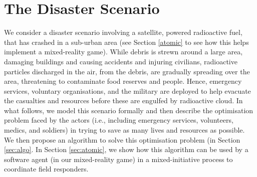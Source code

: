 \section{The Disaster Scenario}

\noindent We consider a disaster scenario involving a satellite, powered radioactive fuel, that has crashed in a sub-urban area (see Section \ref{atomic} to see how this helps implement a  mixed-reality game). While debris is strewn around a large area, damaging buildings and causing accidents and injuring civilians, radioactive particles discharged in the air, from the debris, are gradually spreading over the area, threatening to contaminate food reserves and people. Hence, emergency services, voluntary organisations, and the military are deployed to help evacuate the casualties and resources before these are engulfed by  radioactive cloud.  In what follows, we model this scenario formally and then describe the optimisation problem faced by the actors  (i.e., including emergency services, volunteers, medics, and soldiers) in trying to save as many lives and resources as possible.  We then propose an algorithm to solve this optimisation problem (in Section \ref{sec:algo}. In Section \ref{sec:atomic}, we show how this algorithm can be used by a software agent (in our mixed-reality game) in a mixed-initiative process to coordinate field responders. 

